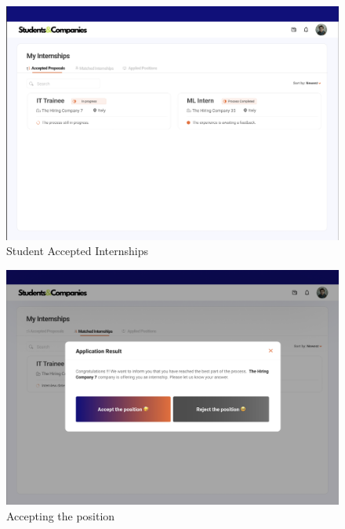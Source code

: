 \documentclass[a4paper,12pt]{article}
\begin{document}
\begin{figure}[H]
    \centering
    \includegraphics[scale = 0.42]{figures/UserInterfaces/Student/AcceptedProposals.png}
    \caption{Student Accepted Internships}
     \centering
\end{figure}
\begin{figure}[H]
    \centering
    \includegraphics[scale = 0.42]{figures/UserInterfaces/Student/AcceptPop-up.png}
    \caption{Accepting the position}
     \centering
\end{figure}
\end{document}
